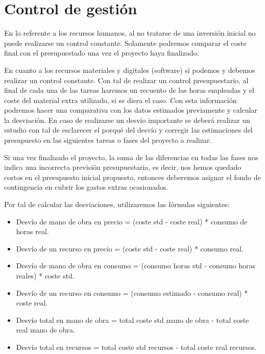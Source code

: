 \documentclass[titlepage,12pt]{report}
\begin{document}
\section{Control de gestión}

En lo referente a los recursos humanos, al no tratarse de una inversión inicial no puede realizarse un control constante. Solamente podremos comparar el coste final con el presupuestado una vez el proyecto haya finalizado.

En cuanto a los recursos materiales y digitales (software) sí podemos y debemos realizar un control constante. Con tal de realizar un control presupuestario, al final de cada una de las tareas haremos un recuento de las horas empleadas y el coste del material extra utilizado, si se diera el caso. Con esta información podremos hacer una comparativa con los datos estimados previamente y calcular la desviación. En caso de realizarse un desvío importante se deberá realizar un estudio con tal de esclarecer el porqué del desvío y corregir las estimaciones del presupuesto en las siguientes tareas o fases del proyecto a realizar.

Si una vez finalizado el proyecto, la suma de las diferencias en todas las fases nos indica una incorrecta previsión presupuestaria, es decir, nos hemos quedado cortos en el presupuesto inicial propuesto, entonces deberemos asignar el fondo de contingencia en cubrir los gastos extras ocasionados.

Por tal de calcular las desviaciones, utilizaremos las fórmulas siguientes:

\begin{itemize}

	\item Desvío de mano de obra en precio = (coste std - coste real) * consumo de horas real.
	\item Desvío de un recurso en precio = (coste std - coste real) * consumo real.
	\item Desvío de mano de obra en consumo = (consumo horas std - consumo horas reales) * coste std.
	\item Desvío de un recurso en consumo = (consumo estimado - consumo real) * coste real.
	\item Desvío total en mano de obra = total coste std mano de obra - total coste real mano de obra.
	\item Desvío total en recursos = total coste std recursos - total coste real recursos.

\end{itemize}
\end{document}
